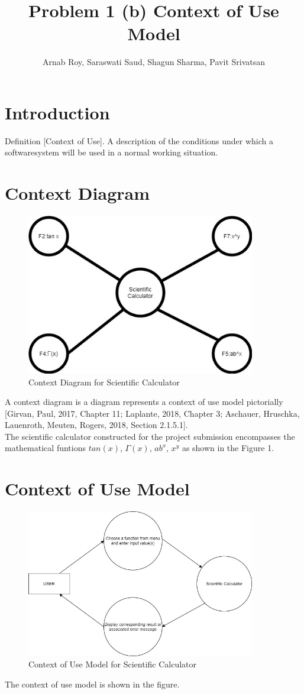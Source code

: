 \documentclass{article}
\title{Problem 1 (b) Context of Use Model}
\author{Arnab Roy, Saraswati Saud, Shagun Sharma, Pavit Srivatsan }
\begin{document}
\date{}
\maketitle

\section{Introduction}
Definition [Context of Use]. A description of the conditions under which a softwaresystem will be used in a normal working situation.
\section{Context Diagram}
\begin{figure}[htp]
    \centering
    \includegraphics[width=10cm]{ContextDiagram}
    \caption{Context Diagram for Scientific Calculator}
    \label{fig:context_diag}
\end{figure}
A context diagram is a diagram represents a context of use model pictorially [Girvan,
Paul, 2017, Chapter 11; Laplante, 2018, Chapter 3; Aschauer, Hruschka, Lauenroth,
Meuten, Rogers, 2018, Section 2.1.5.1].
\\The scientific calculator constructed for the project submission encompasses the mathematical funtions $tan(x)$, $\Gamma(x)$, $ab^x$, $x^y$ as shown in the Figure 1.
\section{Context of Use Model}
\begin{figure}[htp]
    \centering
    \includegraphics[width=10cm]{contextofuse}
    \caption{Context of Use Model for Scientific Calculator}
    \label{fig:context_diag}
\end{figure}
The context of use model is shown in the figure. 
\end{document}
